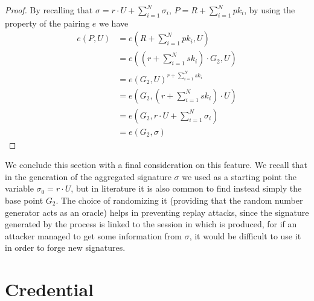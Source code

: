 \documentclass[twocolumn]{article}
\begin{document}
\begin{proof}
By recalling that $\sigma = r\cdot U + \sum_{i=1}^N \sigma_i$, $P = R + \sum_{i=1}^N pk_i$, by using the property of the pairing $e$ we have
\[
\begin{split}
    e(P,U)  &= e(R + \sum_{i=1}^N pk_i, U) \\
            &= e((r + \sum_{i=1}^N sk_i)\cdot G_2,U)\\
            &= e(G_2,U)^{r + \sum_{i=1}^N sk_i}\\
            &= e(G_2,(r + \sum_{i=1}^N sk_i)\cdot U) \\
            &= e(G_2,r\cdot U + \sum_{i=1}^N \sigma_i) \\
            &= e(G_2,\sigma)
\end{split}
\]
\end{proof} 
We conclude this section with a final consideration on this feature. We recall that in the generation of the aggregated signature $\sigma$ we used as a starting point the variable $\sigma_0 = r\cdot U$, but in literature it is also common to find instead simply the base point $G_2$. The choice of randomizing it (providing that the random number generator acts as an oracle) helps in preventing replay attacks, since the signature generated by the process is linked to the session in which is produced, for if an attacker managed to get some information from $\sigma$, it would be difficult to use it in order to forge new signatures.

\pagebreak

\section{Credential}
\label{sec:credential}
\end{document}
